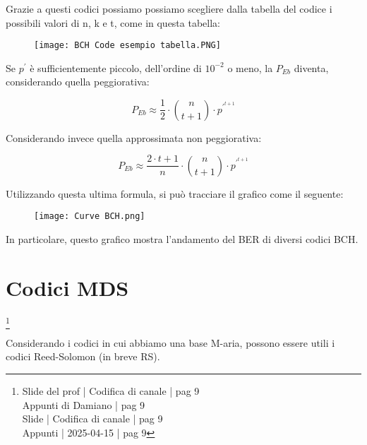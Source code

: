 Grazie a questi codici possiamo possiamo scegliere dalla tabella del codice i possibili valori di n, k e t, come in questa tabella: 

\begin{figure}[h]
    \centering
    \texttt{[image: BCH Code esempio tabella.PNG]}
\end{figure}

Se $p^{'}$ è sufficientemente piccolo, dell'ordine di $10^{-2}$ o meno, 
la $P_{Eb}$ diventa, considerando quella peggiorativa: 

{
    \Large 
    \begin{equation}
        P_{Eb}
        \approx
        \frac{1}{2}
        \cdot 
        \binom{n}{t+1}
        \cdot 
        p^{'^{t+1}}
    \end{equation}
}

Considerando invece quella approssimata non peggiorativa: 

{
    \Large 
    \begin{equation}
        P_{Eb}
        \approx
        \frac{2 \cdot t + 1}{n}
        \cdot 
        \binom{n}{t+1}
        \cdot 
        p^{'^{t+1}}
    \end{equation}
}

\newpage 

Utilizzando questa ultima formula, 
si può tracciare il grafico come il seguente: 

\begin{figure}[h]
    \centering
    \texttt{[image: Curve BCH.png]}
\end{figure}

In particolare, questo grafico mostra l'andamento del BER di diversi codici BCH. \newline

\newpage 

\section{Codici MDS}
\footnote{Slide del prof | Codifica di canale | pag 9 \\
Appunti di Damiano | pag 9\\ 
Slide | Codifica di canale | pag  9\\ 
Appunti | 2025-04-15 | pag 9
}

Considerando i codici in cui abbiamo una base M-aria, 
possono essere utili i codici Reed-Solomon (in breve RS). \newline 

